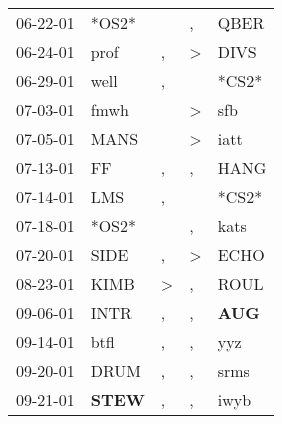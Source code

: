 \begin{supertabular}{p{0.07\textwidth}p{0.06\textwidth}p{0.02\textwidth}p{0.02\textwidth}p{0.06\textwidth}}
          06-22-01\textsuperscript{} &                            *OS2* &                  &                , &           QBER\textsuperscript{} \\
          06-24-01\textsuperscript{} &           prof\textsuperscript{} &                , &     \textgreater &           DIVS\textsuperscript{} \\
          06-29-01\textsuperscript{} &           well\textsuperscript{} &                , &                  &                            *CS2* \\
          07-03-01\textsuperscript{} &           fmwh\textsuperscript{} &                  &     \textgreater &            sfb\textsuperscript{} \\
          07-05-01\textsuperscript{} &           MANS\textsuperscript{} &                  &     \textgreater &           iatt\textsuperscript{} \\
          07-13-01\textsuperscript{} &             FF\textsuperscript{} &                , &                , &           HANG\textsuperscript{} \\
          07-14-01\textsuperscript{} &            LMS\textsuperscript{} &                , &                  &                            *CS2* \\
          07-18-01\textsuperscript{} &                            *OS2* &                  &                , &           kats\textsuperscript{} \\
          07-20-01\textsuperscript{} &           SIDE\textsuperscript{} &                , &     \textgreater &           ECHO\textsuperscript{} \\
          08-23-01\textsuperscript{} &           KIMB\textsuperscript{} &     \textgreater &                , &           ROUL\textsuperscript{} \\
          09-06-01\textsuperscript{} &           INTR\textsuperscript{} &                , &                , &   \textbf{AUG\textsuperscript{}} \\
          09-14-01\textsuperscript{} &           btfl\textsuperscript{} &                , &                , &            yyz\textsuperscript{} \\
          09-20-01\textsuperscript{} &           DRUM\textsuperscript{} &                , &                , &           srms\textsuperscript{} \\
          09-21-01\textsuperscript{} &  \textbf{STEW\textsuperscript{}} &                , &                , &           iwyb\textsuperscript{} \\

\end{supertabular}
